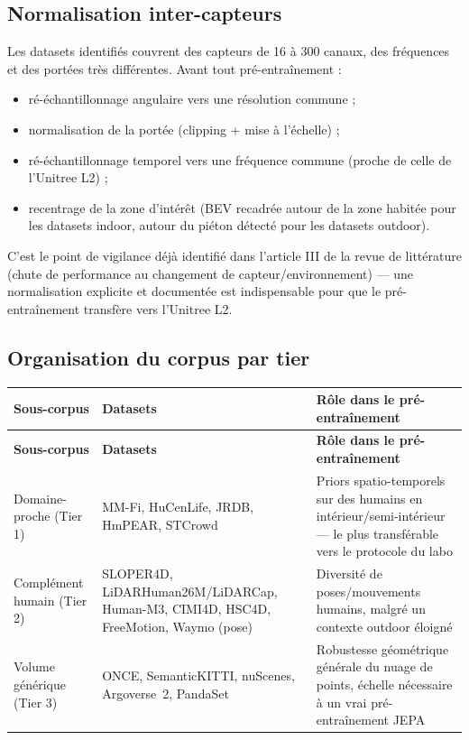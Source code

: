 \documentclass[11pt]{article}
\begin{document}
\subsection{Normalisation inter-capteurs}

Les datasets identifiés couvrent des capteurs de 16 à 300 canaux, des fréquences et des
portées très différentes. Avant tout pré-entraînement :
\begin{itemize}
    \item ré-échantillonnage angulaire vers une résolution commune ;
    \item normalisation de la portée (clipping + mise à l'échelle) ;
    \item ré-échantillonnage temporel vers une fréquence commune (proche de celle de
    l'Unitree L2) ;
    \item recentrage de la zone d'intérêt (BEV recadrée autour de la zone habitée pour les
    datasets indoor, autour du piéton détecté pour les datasets outdoor).
\end{itemize}
C'est le point de vigilance déjà identifié dans l'article III de la revue de littérature
(chute de performance au changement de capteur/environnement) --- une normalisation explicite
et documentée est indispensable pour que le pré-entraînement transfère vers l'Unitree L2.

\subsection{Organisation du corpus par tier}

\begin{longtable}{P{2.8cm} P{6cm} P{5.5cm}}
\toprule
\textbf{Sous-corpus} & \textbf{Datasets} & \textbf{Rôle dans le pré-entraînement} \\
\midrule
\endfirsthead
\toprule
\textbf{Sous-corpus} & \textbf{Datasets} & \textbf{Rôle dans le pré-entraînement} \\
\midrule
\endhead

Domaine-proche (Tier 1) &
MM-Fi, HuCenLife, JRDB, HmPEAR, STCrowd &
Priors spatio-temporels sur des humains en intérieur/semi-intérieur --- le plus transférable
vers le protocole du labo \\
\addlinespace

Complément humain (Tier 2) &
SLOPER4D, LiDARHuman26M/LiDARCap, Human-M3, CIMI4D, HSC4D, FreeMotion, Waymo (pose) &
Diversité de poses/mouvements humains, malgré un contexte outdoor éloigné \\
\addlinespace

Volume générique (Tier 3) &
ONCE, SemanticKITTI, nuScenes, Argoverse~2, PandaSet &
Robustesse géométrique générale du nuage de points, échelle nécessaire à un vrai
pré-entraînement JEPA \\

\bottomrule
\end{longtable}
\end{document}
